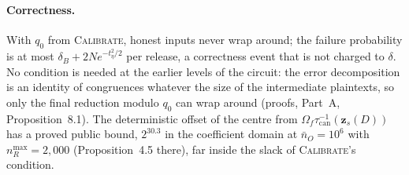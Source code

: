 
\paragraph{Correctness.} With $q_0$ from \textsc{Calibrate}, honest inputs never wrap around; the failure probability is at most $\delta_B + 2Ne^{-t_\eta^2/2}$ per release, a correctness event that is not charged to $\delta$. No condition is needed at the earlier levels of the circuit: the error decomposition is an identity of congruences whatever the size of the intermediate plaintexts, so only the final reduction modulo $q_0$ can wrap around (proofs, Part~A, Proposition~8.1). The deterministic offset of the centre from $\Omega_f\tau_{\mathrm{can}}^{-1}(\mathbf z_s(D))$ has a proved public bound, $2^{30.3}$ in the coefficient domain at $\bar n_O = 10^6$ with $n_R^{\max} = 2{,}000$ (Proposition~4.5 there), far inside the slack of \textsc{Calibrate}'s condition.

